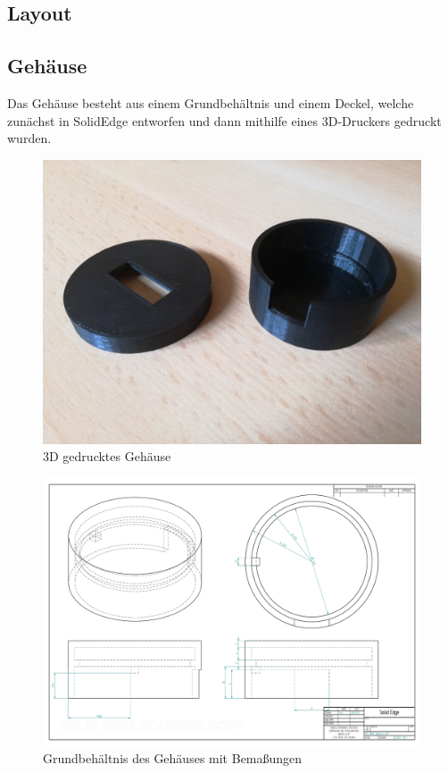 \documentclass[a4paper,
DIV=13,
12pt,
BCOR=10mm,
department=FakEI,
parskip=half,
automark,
]{article}
\begin{document}
\subsection{Layout}

\subsection{Gehäuse}
Das Gehäuse besteht aus einem Grundbehältnis und einem Deckel, welche zunächst in SolidEdge entworfen und dann mithilfe eines 3D-Druckers gedruckt wurden.
\begin{figure}[!hbpt]
 \begin{center} \includegraphics[width=1\textwidth]{Gehauuse_Stimmungslicht.jpg}
 \caption{3D gedrucktes Gehäuse}
 \label{fig:Register}
  \end{center}
\end{figure}


\begin{figure}[!hbpt]
 \begin{center} \includegraphics[width=1.4\textwidth,angle=-90]{gehauuse_4.pdf}
 \caption{Grundbehältnis des Gehäuses mit Bemaßungen}
 \label{fig:Register}
  \end{center}
\end{figure}
\end{document}
